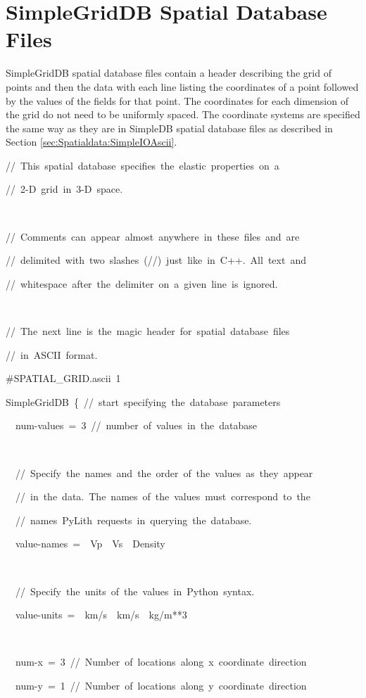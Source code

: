\section{\label{sec:Spatialdata:SimpleGrid}SimpleGridDB Spatial Database
Files}

SimpleGridDB spatial database files contain a header describing the
grid of points and then the data with each line listing the coordinates
of a point followed by the values of the fields for that point. The
coordinates for each dimension of the grid do not need to be uniformly
spaced. The coordinate systems are specified the same way as they
are in SimpleDB spatial database files as described in Section \ref{sec:Spatialdata:SimpleIOAscii}. 
\begin{lyxcode}
//~This~spatial~database~specifies~the~elastic~properties~on~a

//~2-D~grid~in~3-D~space.

~

//~Comments~can~appear~almost~anywhere~in~these~files~and~are

//~delimited~with~two~slashes~(//)~just~like~in~C++.~All~text~and~

//~whitespace~after~the~delimiter~on~a~given~line~is~ignored.

~

//~The~next~line~is~the~magic~header~for~spatial~database~files~

//~in~ASCII~format.

\#SPATIAL\_GRID.ascii~1

SimpleGridDB~\{~//~start~specifying~the~database~parameters

~~num-values~=~3~//~number~of~values~in~the~database

~

~~//~Specify~the~names~and~the~order~of~the~values~as~they~appear~

~~//~in~the~data.~The~names~of~the~values~must~correspond~to~the

~~//~names~PyLith~requests~in~querying~the~database.

~~value-names~=~~Vp~~Vs~~Density

~

~~//~Specify~the~units~of~the~values~in~Python~syntax.

~~value-units~=~~km/s~~km/s~~kg/m{*}{*}3

~~

~~num-x~=~3~//~Number~of~locations~along~x~coordinate~direction

~~num-y~=~1~//~Number~of~locations~along~y~coordinate~direction


\end{lyxcode}
